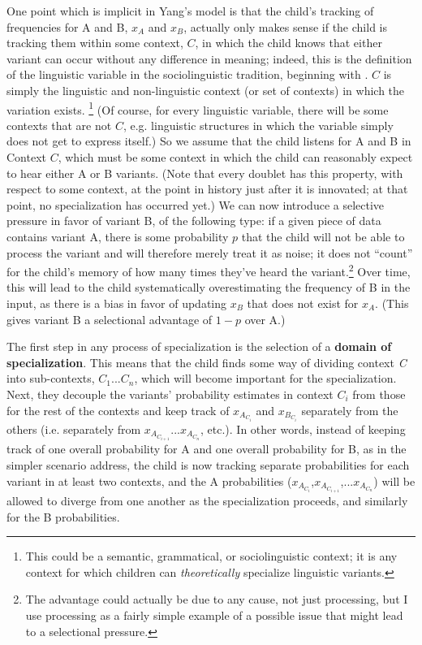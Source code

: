 One point which is implicit in Yang's model is that the child's tracking of frequencies for A and B, $x_A$ and $x_B$, actually only makes sense if the child is tracking them within some context, $C$, in which the child knows that either variant can occur without any difference in meaning; indeed, this is the definition of the linguistic variable in the sociolinguistic tradition, beginning with \citep{wlh1968}.
$C$ is simply the linguistic and non-linguistic context (or set of contexts) in which the variation exists.
\footnote{This could be a semantic, grammatical, or sociolinguistic context; it is any context for which children can \textsl{theoretically} specialize linguistic variants.}
(Of course, for every linguistic variable, there will be some contexts that are not $C$, e.g. linguistic structures in which the variable simply does not get to express itself.)
So we assume that the child listens for A and B in Context $C$, which must be some context in which the child can reasonably expect to hear either A or B variants.
(Note that every doublet has this property, with respect to some context, at the point in history just after it is innovated; at that point, no specialization has occurred yet.)
We can now introduce a selective pressure in favor of variant B, of the following type:
if a given piece of data contains variant A, there is some probability $p$ that the child will not be able to process the variant and will therefore merely treat it as noise; it does not ``count'' for the child's memory of how many times they've heard the variant.\footnote{The advantage could actually be due to any cause, not just processing, but I use processing as a fairly simple example of a possible issue that might lead to a selectional pressure.}
Over time, this will lead to the child systematically overestimating the frequency of B in the input, as there is a bias in favor of updating $x_B$ that does not exist for $x_A$.
(This gives variant B a selectional advantage of $1-p$ over A.)

The first step in any process of specialization is the selection of a \textbf{domain of specialization}. This means that the child finds some way of dividing context \textsl{C} into sub-contexts, $C_1$...$C_n$, which will become important for the specialization. Next, they decouple the variants' probability estimates in context $C_i$ from those for the rest of the contexts and keep track of $x_{A_{C_i}}$ and $x_{B_{C_i}}$ separately from the others (i.e. separately from $x_{A_{C_{i+1}}}$...$x_{A_{C_{n}}}$, etc.). In other words, instead of keeping track of one overall probability for A and one overall probability for B, as in the simpler scenario \citet{yang2000,2002} address, the child is now tracking separate probabilities for each variant in at least two contexts, and the A probabilities ($x_{A_{C_i}}$,$x_{A_{C_{i+1}}}$,...$x_{A_{C_n}}$) will be allowed to diverge from one another as the specialization proceeds, and similarly for the B probabilities.

